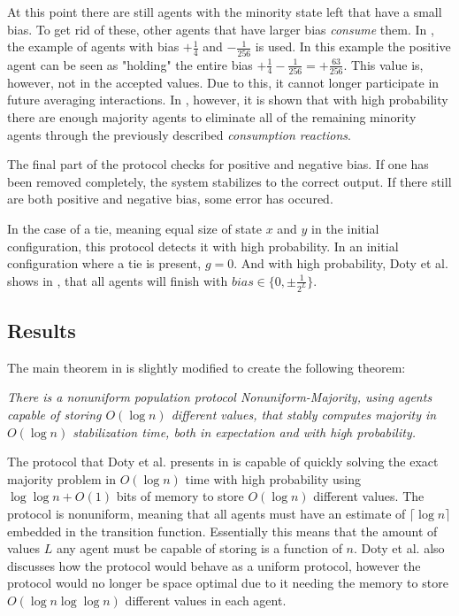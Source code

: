 At this point there are still agents with the minority state left that have a small bias. To get rid of these, other agents that have larger bias \emph{consume} them. In \cite{dotyTimeSpaceOptimal2022}, the example of agents with bias $+ \frac{1}{4}$ and $- \frac{1}{256}$ is used. In this example the positive agent can be seen as "holding" the entire bias $+ \frac{1}{4} - \frac{1}{256} = + \frac{63}{256}$. This value is, however, not in the accepted values. Due to this, it cannot longer participate in future averaging interactions. In \cite{dotyTimeSpaceOptimal2022}, however, it is shown that with high probability there are enough majority agents to eliminate all of the remaining minority agents through the previously described \emph{consumption reactions}.

The final part of the protocol checks for positive and negative bias. If one has been removed completely, the system stabilizes to the correct output. If there still are both positive and negative bias, some error has occured.

In the case of a tie, meaning equal size of state $x$ and $y$ in the initial configuration, this protocol detects it with high probability. In an initial configuration where a tie is present, $g = 0$. And with high probability, Doty et al. shows in \cite{dotyTimeSpaceOptimal2022}, that all agents will finish with $bias \in \{ 0, \pm \frac{1}{2^L} \}$. 


\subsection{Results}

The main theorem in \cite{dotyTimeSpaceOptimal2022} is slightly modified to create the following theorem: 

 \begin{theorem}
    \textit{
        There is a nonuniform population protocol Nonuniform-Majority, using agents capable of storing $O(\log n)$ different values, that stably computes majority in $O(\log n)$ stabilization time, both in expectation and with high probability.
    }
 \end{theorem} 

The protocol that Doty et al. presents in \cite{dotyTimeSpaceOptimal2022} is capable of quickly solving the exact majority problem in $O(\log n)$ time with high probability using $\log \log n + O(1)$ bits of memory to store $O(\log n)$ different values. The protocol is nonuniform, meaning that all agents must have an estimate of $\lceil \log n \rceil$ embedded in the transition function. Essentially this means that the amount of values $L$ any agent must be capable of storing is a function of $n$. Doty et al. also discusses how the protocol would behave as a uniform protocol, however the protocol would no longer be space optimal due to it needing the memory to store $O(\log n \log \log n)$ different values in each agent. 

